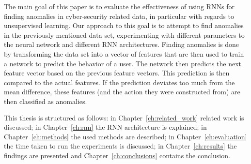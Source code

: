 The main goal of this paper is to evaluate the effectiveness of using RNNs for finding anomalies in cyber-security related data, in particular with regards to unsupervised learning. Our approach to this goal is to attempt to find anomalies in the previously mentioned data set, experimenting with different parameters to the neural network and different RNN architectures. Finding anomalies is done by transforming the data set into a vector of features that are then used to train a network to predict the behavior of a user. The network then predicts the next feature vector based on the previous feature vectors. This prediction is then compared to the actual features. If the prediction deviates too much from the mean difference, these features (and the action they were constructed from) are then classified as anomalies.

This thesis is structured as follows: in Chapter~\ref{ch:related_work} related work is discussed; in Chapter~\ref{ch:rnn} the RNN architecture is explained; in Chapter~\ref{ch:methods} the used methods are described; in Chapter~\ref{ch:evaluation} the time taken to run the experiments is discussed; in Chapter~\ref{ch:results} the findings are presented and Chapter~\ref{ch:conclusions} contains the conclusion.